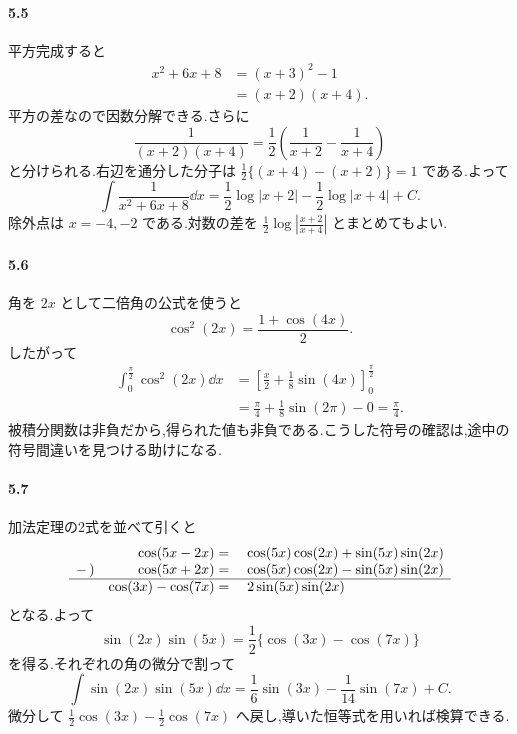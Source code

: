 \paragraph{5.5}
平方完成すると
\begin{align*}
 x^2+6x+8&=(x+3)^2-1\\
 &=(x+2)(x+4).
\end{align*}
平方の差なので因数分解できる.さらに
\[
 \frac1{(x+2)(x+4)}
 =\frac12\left(\frac1{x+2}-\frac1{x+4}\right)
\]
と分けられる.右辺を通分した分子は $\frac12\{(x+4)-(x+2)\}=1$ である.よって
\[
 \int\frac1{x^2+6x+8}\dd x
 =\frac12\log|x+2|-\frac12\log|x+4|+C.
\]
除外点は $x=-4,-2$ である.対数の差を $\frac12\log\left|\frac{x+2}{x+4}\right|$ とまとめてもよい.

\paragraph{5.6}
角を $2x$ として二倍角の公式を使うと
\[
 \cos^2(2x)=\frac{1+\cos(4x)}2.
\]
したがって
\[
\begin{aligned}
 \int_0^{\frac\pi2}\cos^2(2x)\dd x
 &=\left[\frac x2+\frac18\sin(4x)\right]_0^{\frac\pi2}\\
 &=\frac\pi4+\frac18\sin(2\pi)-0=\frac\pi4.
\end{aligned}
\]
被積分関数は非負だから,得られた値も非負である.こうした符号の確認は,途中の符号間違いを見つける助けになる.

\paragraph{5.7}
加法定理の2式を並べて引くと
\[
 \begin{array}{rrl}
  &\cos(5x-2x)={}&\cos(5x)\cos(2x)+\sin(5x)\sin(2x)\\
  -\,)&\cos(5x+2x)={}&\cos(5x)\cos(2x)-\sin(5x)\sin(2x)\\ \hline
  &\cos(3x)-\cos(7x)={}&2\sin(5x)\sin(2x)
 \end{array}
\]
となる.よって
\[
 \sin(2x)\sin(5x)=\frac12\{\cos(3x)-\cos(7x)\}
\]
を得る.それぞれの角の微分で割って
\[
 \int\sin(2x)\sin(5x)\dd x
 =\frac16\sin(3x)-\frac1{14}\sin(7x)+C.
\]
微分して $\frac12\cos(3x)-\frac12\cos(7x)$ へ戻し,導いた恒等式を用いれば検算できる.
